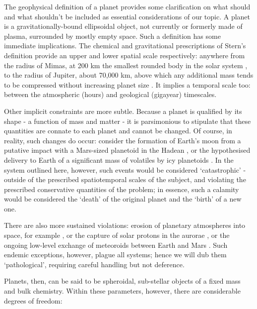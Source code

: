 \documentclass[a4paper,11pt,oneside]{book}
\begin{document}
The geophysical definition of a planet provides some clarification on what should and what shouldn't be included as essential considerations of our topic. A planet is a gravitationally-bound ellipsoidal object, not currently or formerly made of plasma, surrounded by mostly empty space. Such a definition has some immediate implications. The chemical and gravitational prescriptions of Stern's definition provide an upper and lower spatial scale respectively: anywhere from the radius of Mimas, at 200 km the smallest rounded body in the solar system \cite{Lodders1998-dj}, to the radius of Jupiter, about 70,000 km, above which any additional mass tends to be compressed without increasing planet size \cite{Basri2006-vw}. It implies a temporal scale too: between the atmospheric (hours) and geological (gigayear) timescales.

Other implicit constraints are more subtle. Because a planet is qualified by its shape - a function of mass and matter - it is parsimonious to stipulate that these quantities are connate to each planet and cannot be changed. Of course, in reality, such changes do occur: consider the formation of Earth's moon from a putative impact with a Mars-sized planetoid in the Hadean \cite{Canup2012-nz}, or the hypothesised delivery to Earth of a significant mass of volatiles by icy planetoids \cite{Owen2000-ze}. In the system outlined here, however, such events would be considered `catastrophic' - outside of the prescribed spatiotemporal scales of the subject, and violating the prescribed conservative quantities of the problem; in essence, such a calamity would be considered the `death' of the original planet and the `birth' of a new one.

There are also more sustained violations: erosion of planetary atmospheres into space, for example \citet{Perez_de_Tejada1992-qq, Kulikov2006-pc}, or the capture of solar protons in the aurorae \cite{Rees1982-vr}, or the ongoing low-level exchange of meteoroids between Earth and Mars \cite{Melosh1993-cb}. Such endemic exceptions, however, plague all systems; hence we will dub them `pathological', requiring careful handling but not deference.

Planets, then, can be said to be spheroidal, sub-stellar objects of a fixed mass and bulk chemistry. Within these parameters, however, there are considerable degrees of freedom:
\end{document}
